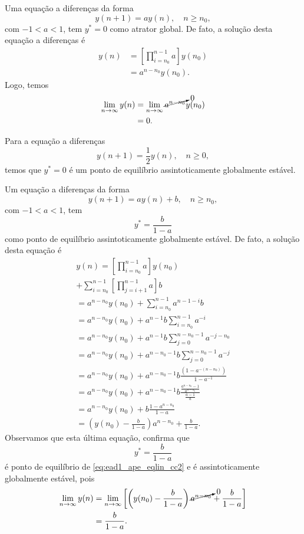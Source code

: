 Uma equação a diferenças da forma
\begin{equation}
  y(n+1) = ay(n),\quad n\geq n_0,
\end{equation}
com $-1<a<1$, tem $y^*=0$ como atrator global. De fato, a solução desta equação a diferenças é
\begin{align}
  y(n) &= \left[\prod_{i=n_0}^{n-1}a\right]y(n_0) \\
  &= a^{n-n_0}y(n_0).
\end{align}
Logo, temos
\begin{align}
  \lim_{n\to\infty} y(n) &= \lim_{n\to\infty} \cancelto{0}{a^{n-n_0}}y(n_0)\\
  &= 0.
\end{align}

\begin{ex}
  Para a equação a diferenças
  \begin{equation}
    y(n+1) = \frac{1}{2}y(n),\quad n\geq 0,
  \end{equation}
  temos que $y^*=0$ é um ponto de equilíbrio assintoticamente globalmente estável.
\end{ex}

Um equação a diferenças da forma
\begin{equation}\label{eq:ead1_ape_eqlin_cc2}
  y(n+1) = ay(n) + b,\quad n\geq n_0,
\end{equation}
com $-1<a<1$, tem
\begin{equation}
  y^* = \frac{b}{1-a}
\end{equation}
como ponto de equilíbrio assintoticamente globalmente estável. De fato, a solução desta equação é
\begin{gather}
  y(n) = \left[\prod_{i=n_0}^{n-1} a\right]y(n_0) \nonumber\\
  + \sum_{i=n_0}^{n-1}\left[\prod_{j=i+1}^{n-1} a\right]b \\
  = a^{n-n_0}y(n_0) + \sum_{i=n_0}^{n-1}a^{n-1-i}b\\
  = a^{n-n_0}y(n_0) + a^{n-1}b\sum_{i=n_0}^{n-1}a^{-i} \\
  = a^{n-n_0}y(n_0) + a^{n-1}b\sum_{j=0}^{n-n_0-1}a^{-j-n_0}\\
  = a^{n-n_0}y(n_0) + a^{n-n_0-1}b\sum_{j=0}^{n-n_0-1}a^{-j}\\
  = a^{n-n_0}y(n_0) + a^{n-n_0-1}b\frac{(1-a^{-(n-n_0)})}{1-a^{-1}}\\
  = a^{n-n_0}y(n_0) + a^{n-n_0-1}b\frac{\frac{a^{n-n_0}-1}{a^{n-n_0}}}{\frac{a-1}{a}}\\
  = a^{n-n_0}y(n_0) + b\frac{1-a^{n-n_0}}{1-a} \\
  = \left(y(n_0) - \frac{b}{1-a}\right)a^{n-n_0} + \frac{b}{1-a}.
\end{gather}
Observamos que esta última equação, confirma que
\begin{equation}
  y^* = \frac{b}{1-a}
\end{equation}
é ponto de equilíbrio de \eqref{eq:ead1_ape_eqlin_cc2} e é assintoticamente globalmente estável, pois
\begin{align}
  \lim_{n\to\infty} y(n) &= \lim_{n\to\infty} \left[\left(y(n_0) - \frac{b}{1-a}\right)\cancelto{0}{a^{n-n_0}} + \frac{b}{1-a}\right] \\
  &=  \frac{b}{1-a}.
\end{align}

